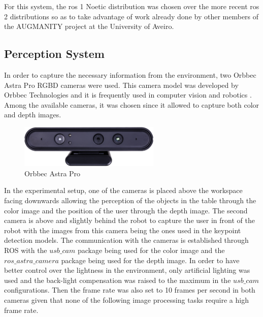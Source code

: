 For this system, the \acs{ros} 1 Noetic distribution was chosen over the more recent \acs{ros} 2 distributions so as to take advantage of work already done by other members of the AUGMANITY project at the University of Aveiro.

\subsection{Perception System}
\label{subsection:perception_system}

In order to capture the necessary information from the environment, two Orbbec Astra Pro RGBD cameras were used. This camera model was developed by Orbbec Technologies and it is frequently used in computer vision and robotics \cite{AstraPro}. Among the available cameras, it was chosen since it allowed to capture both color and depth images.

\begin{figure}[ht]
\centerline{\includegraphics[width=0.6\textwidth]{figs/AstraPro.jpg}}
\caption[Orbbec Astra Pro]{Orbbec Astra Pro \cite{AstraPro}}
\label{fig:orbbec_astra_pro}
\end{figure}

In the experimental setup, one of the cameras is placed above the workspace facing downwards allowing the perception of the objects in the table through the color image and the position of the user through the depth image. The second camera is above and slightly behind the robot to capture the user in front of the robot with the images from this camera being the ones used in the keypoint detection models. The communication with the cameras is established through ROS with the $usb\_cam$ package being used for the color image and the $ros\_astra\_camera$ package being used for the depth image. In order to have better control over the lightness in the environment, only artificial lighting was used and the back-light compensation was raised to the maximum in the $usb\_cam$ configurations. Then the frame rate was also set to 10 frames per second in both cameras given that none of the following image processing tasks require a high frame rate.

